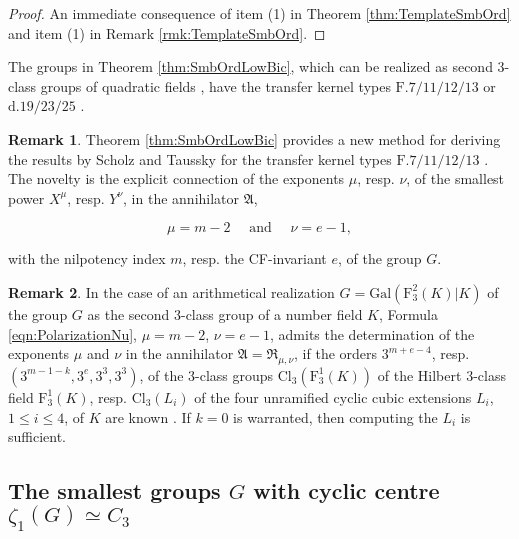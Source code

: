 \documentclass{amsart}
\theoremstyle{definition}
\newtheorem{remark}{Remark}[section]
\numberwithin{equation}{section}
\begin{document}
\begin{proof}
An immediate consequence of item (1) in Theorem
\ref{thm:TemplateSmbOrd}
and item (1) in Remark
\ref{rmk:TemplateSmbOrd}.
\end{proof}


\noindent
The groups in Theorem
\ref{thm:SmbOrdLowBic},
which can be realized as second \(3\)-class groups of quadratic fields
\cite{Ma4},
have the transfer kernel types \(\mathrm{F.7/11/12/13}\) or \(\mathrm{d.19/23/25}\)
\cite{Ma2}.


\begin{remark}
\label{rmk:SmbOrdLowBic}
Theorem
\ref{thm:SmbOrdLowBic}
provides a new method for deriving the results by Scholz and Taussky
\cite{SoTa}
for the transfer kernel types \(\mathrm{F.7/11/12/13}\)
\cite{Ma2}.
The novelty is the explicit connection of the exponents \(\mu\), resp. \(\nu\),
of the smallest power \(X^\mu\), resp. \(Y^\nu\), in the annihilator \(\mathfrak{A}\),

\begin{equation}
\label{eqn:PolarizationNu}
\mu=m-2 \quad \text{ and } \quad \nu=e-1,
\end{equation}

\noindent
with the nilpotency index \(m\), resp. the CF-invariant \(e\), of the group \(G\).
\end{remark}


\begin{remark}
\label{rmk:ClassFieldTheoryNu}
In the case of an arithmetical realization
\(G=\mathrm{Gal}(\mathrm{F}_3^2(K)\vert K)\)
of the group \(G\)
as the second \(3\)-class group of a number field \(K\), Formula
\eqref{eqn:PolarizationNu},
\(\mu=m-2\), \(\nu=e-1\), admits
the determination of the exponents \(\mu\) and \(\nu\) in the annihilator \(\mathfrak{A}=\mathfrak{R}_{\mu,\nu}\),
if the orders \(3^{m+e-4}\), resp.  \((3^{m-1-k},3^{e},3^3,3^3)\), of the \(3\)-class groups
\(\mathrm{Cl}_3(\mathrm{F}_3^1(K))\) of the Hilbert \(3\)-class field \(\mathrm{F}_3^1(K)\),
resp. \(\mathrm{Cl}_3(L_i)\) of the four unramified cyclic cubic extensions \(L_i\), \(1\le i\le 4\),
of \(K\) are known
\cite[Thm. 3.12]{Ma4}.
If \(k=0\) is warranted, then computing the \(L_i\) is sufficient.
\end{remark}



\subsection{The smallest groups \(G\) with cyclic centre \(\zeta_1(G)\simeq C_3\)}
\label{ss:LowSmlCyc}
\end{document}
